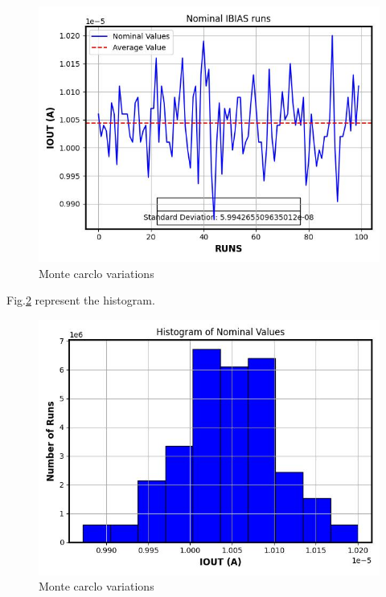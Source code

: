 \documentclass{article}
\begin{document}
\begin{figure}[H] %
    \centering
    \includegraphics[width=.7\textwidth]{./Nominal_IBIAS_runs.jpg} %
    \caption{Monte carclo variations}
    \label{fig:nominal}
\end{figure}


Fig.\ref{fig:histogram} represent the histogram.

\begin{figure}[H] %
    \centering
    \includegraphics[width=.7\textwidth]{./Nominal_IBIAS_runs_histogram.jpg} %
    \caption{Monte carclo variations}
    \label{fig:histogram}
\end{figure}
\end{document}
